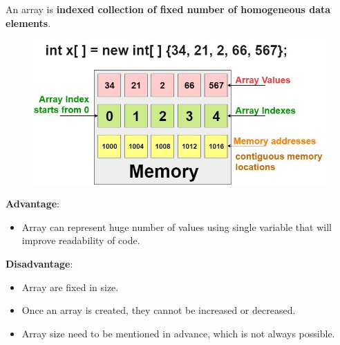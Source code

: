 \setlength{\columnsep}{3pt}
\begin{flushleft}
	\bigskip
	An array is \textbf{indexed collection of fixed number of homogeneous data elements}.
	
	\bigskip\bigskip
	\begin{figure}[h!]
		\centering
		\includegraphics[scale=.45]{content/chapter4/images/array.jpg}
	\end{figure}		
	
	\textbf{Advantage}:
	\begin{itemize}
		\item Array can represent huge number of values using single variable that will improve readability of code.
	\end{itemize}
	
	\textbf{Disadvantage}:
	\begin{itemize}
		\item Array are fixed in size.
		\item Once an array is created, they cannot be increased or decreased.
		\item Array size need to be mentioned in advance, which is not always possible.
	\end{itemize}
	
	
\end{flushleft}

\newpage




